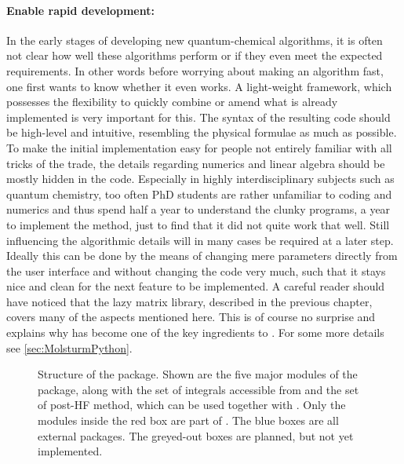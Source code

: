 \paragraph{Enable rapid development:}
In the early stages of developing new quantum-chemical algorithms,
it is often not clear how well these algorithms perform
or if they even meet the expected requirements.
In other words before worrying about making an algorithm fast,
one first wants to know whether it even works.
A light-weight framework, which possesses the flexibility
to quickly combine or amend what is already implemented is very important for this.
The syntax of the resulting code should be high-level and intuitive,
resembling the physical formulae as much as possible.
To make the initial implementation easy for people
not entirely familiar with all tricks of the trade,
the details regarding numerics and linear algebra
should be mostly hidden in the code.
Especially in highly interdisciplinary subjects such as quantum chemistry,
too often PhD students are rather unfamiliar to coding and numerics
and thus spend half a year to understand the clunky programs,
a year to implement the method,
just to find that it did not quite work that well.
Still influencing the algorithmic details
will in many cases be required at a later step.
Ideally this can be done by the means of changing mere parameters
directly from the user interface and
without changing the code very much,
such that it stays nice and clean for the next feature to be implemented.
A careful reader should have noticed that the \lazyten lazy matrix library,
described in the previous chapter,
covers many of the aspects mentioned here.
This is of course no surprise and explains why \lazyten has
become one of the key ingredients to \molsturm.
For some more details see \vref{sec:MolsturmPython}.
%
%
\begin{figure}
	\centering
	\caption[Structure of the \molsturm package]
	{Structure of the \molsturm package. Shown are the five major
	modules of the package,
	along with the set of integrals accessible from \gint and the set of post-HF method,
	which can be used together with \molsturm.
	Only the modules inside the red box are part of \molsturm.
	The blue boxes are all external packages.
	The greyed-out boxes are planned, but not yet implemented.
	}
	\label{fig:structureMolsturm}
\end{figure}
